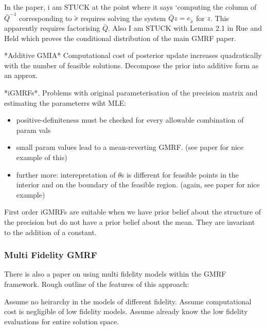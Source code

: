 \documentclass{article}
\begin{document}
In the paper, i am STUCK at the point where it says `computing the column of $\bar{Q}^{-1}$ corresponding to $\tilde{x}$ requires solving the system $\bar{Q}z=e_{\tilde{x}}$ for $z$. This apparently requires factorising $\bar{Q}$.
Also I am STUCK with Lemma 2.1 in Rue and Held which proves the conditional distribution of the main GMRF paper. 

*Additive GMIA* Computational cost of posterior update increases quadratically with the number of feasible solutions. Decompose the prior into additive form as an approx. 

*iGMRFs*. Problems with original parameterisation of the precision matrix and estimating the parameterrs wiht MLE:

\begin{itemize}
\item positive-definiteness must be checked for every allowable combination of param vals
\item small param values lead to a mean-reverting GMRF. (see paper for nice example of this)
  \item further more: interepretation of $\theta$s is different for feasible points in the interior and on the boundary of the feasible region. (again, see paper for nice example)
\end{itemize}

First order iGMRFs are suitable when we have prior belief about the structure of the precision but do not have a prior belief about the mean. They are invariant to the addition of a constant. 

\subsubsection{Multi Fidelity GMRF}

There is also a paper on using multi fidelity models within the GMRF framework. Rough outline of the features of this approach:

Assume no heirarchy in the models of different fidelity. Assume computational cost is negligible of low fidelity models. Assume already know the low fidelity evaluations for entire solution space.
\end{document}
